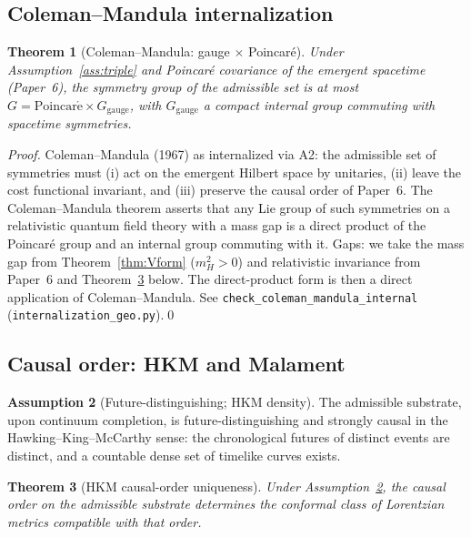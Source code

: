 \documentclass[11pt,a4paper]{article}
\newtheorem{theorem}{Theorem}[section]
\theoremstyle{definition}
\newtheorem{assumption}[theorem]{Assumption}
\newcommand{\coderef}[2]{\texttt{#1}\,(\texttt{#2})}
\begin{document}
\subsection{Coleman--Mandula internalization}

\begin{theorem}[Coleman--Mandula: gauge $\times$ Poincaré]
\label{thm:CM}
Under Assumption~\ref{ass:triple} and Poincaré covariance of the emergent spacetime (Paper~6), the symmetry group of the admissible set is at most $G=\mathrm{Poincar\acute e}\times G_{\mathrm{gauge}}$, with $G_{\mathrm{gauge}}$ a compact internal group commuting with spacetime symmetries.
\end{theorem}

\begin{proof}
Coleman--Mandula (1967) as internalized via A2: the admissible set of symmetries must (i) act on the emergent Hilbert space by unitaries, (ii) leave the cost functional invariant, and (iii) preserve the causal order of Paper~6.  The Coleman--Mandula theorem asserts that any Lie group of such symmetries on a relativistic quantum field theory with a mass gap is a direct product of the Poincaré group and an internal group commuting with it.  Gaps: we take the mass gap from Theorem~\ref{thm:Vform} ($m_H^2>0$) and relativistic invariance from Paper~6 and Theorem~\ref{thm:HKM} below.  The direct-product form is then a direct application of Coleman--Mandula.  See \coderef{check\_coleman\_mandula\_internal}{internalization\_geo.py}.\qed
\end{proof}

\subsection{Causal order: HKM and Malament}

\begin{assumption}[Future-distinguishing; HKM density]
\label{ass:HKM}
The admissible substrate, upon continuum completion, is future-distinguishing and strongly causal in the Hawking--King--McCarthy sense: the chronological futures of distinct events are distinct, and a countable dense set of timelike curves exists.
\end{assumption}

\begin{theorem}[HKM causal-order uniqueness]
\label{thm:HKM}
Under Assumption~\ref{ass:HKM}, the causal order on the admissible substrate determines the conformal class of Lorentzian metrics compatible with that order.
\end{theorem}
\end{document}
